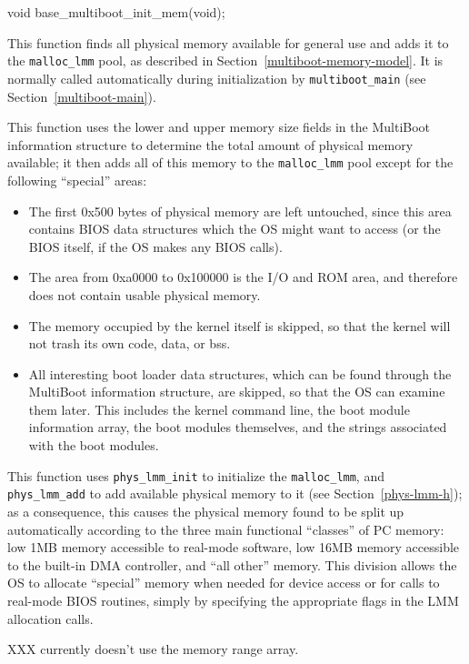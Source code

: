 \label{base-multiboot-init-mem}
\begin{apisyn}

	\funcproto void base_multiboot_init_mem(void);
\end{apisyn}
\begin{apidesc}
	This function finds all physical memory available for general use
	and adds it to the {\tt malloc_lmm} pool,
	as described in Section~\ref{multiboot-memory-model}.
	It is normally called automatically during initialization
	by {\tt multiboot_main} (see Section~\ref{multiboot-main}).

	This function uses the lower and upper memory size fields
	in the MultiBoot information structure
	to determine the total amount of physical memory available;
	it then adds all of this memory to the {\tt malloc_lmm} pool
	except for the following ``special'' areas:
	\begin{itemize}
	\item	The first 0x500 bytes of physical memory are left untouched,
		since this area contains BIOS data structures
		which the OS might want to access
		(or the BIOS itself, if the OS makes any BIOS calls).
	\item	The area from 0xa0000 to 0x100000 is the I/O and ROM area,
		and therefore does not contain usable physical memory.
	\item	The memory occupied by the kernel itself is skipped,
		so that the kernel will not trash its own code, data, or bss.
	\item	All interesting boot loader data structures,
		which can be found through the MultiBoot information structure,
		are skipped, so that the OS can examine them later.
		This includes the kernel command line,
		the boot module information array,
		the boot modules themselves,
		and the strings associated with the boot modules.
	\end{itemize}

	This function uses {\tt phys_lmm_init}
	to initialize the {\tt malloc_lmm},
	and {\tt phys_lmm_add} to add available physical memory to it
	(see Section~\ref{phys-lmm-h});
	as a consequence, this causes the physical memory found
	to be split up automatically
	according to the three main functional ``classes'' of PC memory:
	low 1MB memory accessible to real-mode software,
	low 16MB memory accessible to the built-in DMA controller,
	and ``all other'' memory.
	This division allows the OS to allocate ``special'' memory when needed
	for device access or for calls to real-mode BIOS routines,
	simply by specifying the appropriate flags in the LMM allocation calls.

	XXX currently doesn't use the memory range array.
\end{apidesc}
